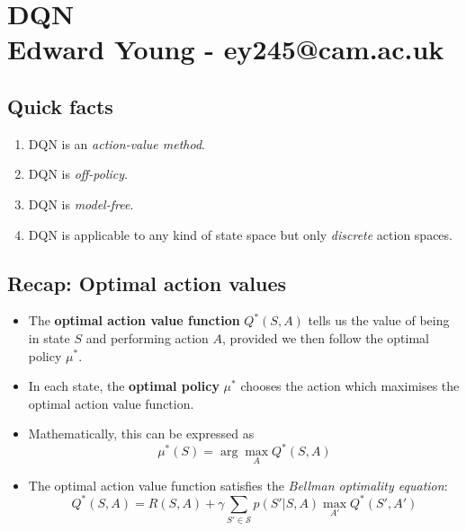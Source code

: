 \documentclass[]{article}
\title{}
\author{Edward Young \\ \large ey245@cam.ac.uk}
\date{}
\begin{document}
\section*{DQN \\ \small Edward Young - ey245@cam.ac.uk}

\subsection*{Quick facts}
\begin{enumerate}
	\item DQN is an \emph{action-value method}. 
	\item DQN is \emph{off-policy}.
	\item DQN is \emph{model-free}.
	\item DQN is applicable to any kind of state space but only \emph{discrete} action spaces.
\end{enumerate}


\subsection*{Recap: Optimal action values}
\begin{itemize}
	\item The \textbf{optimal action value function} $Q^*(S,A)$ tells us the value of being in state $S$ and performing action $A$, provided we then follow the optimal policy $\mu^*$.
	\item In each state, the \textbf{optimal policy} $\mu^*$ chooses the action which maximises the optimal action value function. 
	\item Mathematically, this can be expressed as
	\begin{equation}\label{eq:optimal policy from optimal values}
		\mu^*(S) = \arg\max_A Q^*(S,A)
	\end{equation}
	\item The optimal action value function satisfies the \emph{Bellman optimality equation}:
	\begin{equation}\label{eq:Bellman Optimality}
		Q^*(S,A) = R(S,A) + \gamma \sum_{S' \in \mathcal{S}} p(S'|S,A) \max_{A'} Q^*(S',A')
	\end{equation}
\end{itemize} 
\end{document}
